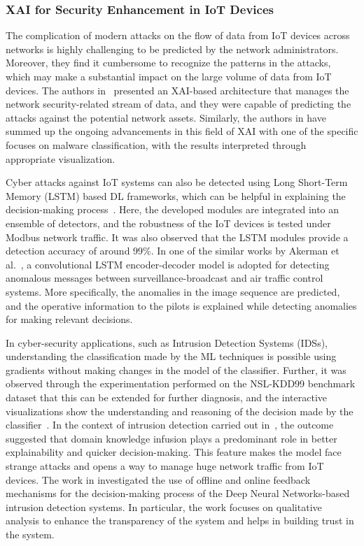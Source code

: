 \documentclass[journal]{IEEEtran}
\begin{document}
\subsubsection{XAI for Security Enhancement in IoT Devices}

The complication of modern attacks on the flow of data from IoT devices across networks is highly challenging to be predicted by the network administrators. Moreover, they find it cumbersome to recognize the patterns in the attacks, which may make a substantial impact on the large volume of data from IoT devices. The authors in~\cite{miloslavskaya2020stream} presented an XAI-based architecture that manages the network security-related stream of data, and they were capable of predicting the attacks against the potential network assets. Similarly, the authors in \cite{mathews2019explainable} have summed up the ongoing advancements in this field of XAI with one of the specific focuses on malware classification, with the results interpreted through appropriate visualization.

Cyber attacks against IoT systems can also be detected using Long Short-Term Memory (LSTM) based DL frameworks, which can be helpful in explaining the decision-making process~\cite{saharkhizan2020ensemble}. Here, the developed modules are integrated into an ensemble of detectors, and the robustness of the IoT devices is tested under Modbus network traffic. It was also observed that the LSTM modules provide a detection accuracy of around 99\%. In one of the similar works by Akerman et al.~\cite{akerman2019vizads}, a convolutional LSTM encoder-decoder model is adopted for detecting anomalous messages between surveillance-broadcast and air traffic control systems. More specifically, the anomalies in the image sequence are predicted, and the operative information to the pilots is explained while detecting anomalies for making relevant decisions.   

In cyber-security applications, such as Intrusion Detection Systems (IDSs), understanding the classification made by the ML techniques is possible using gradients without making changes in the model of the classifier. Further, it was observed through the experimentation performed on the NSL-KDD99 benchmark dataset that this can be extended for further diagnosis, and the interactive visualizations show the understanding and reasoning of the decision made by the classifier~\cite{marino2018adversarial}. In the context of intrusion detection carried out in~\cite{islam2019domain}, the outcome suggested that domain knowledge infusion plays a predominant role in better explainability and quicker decision-making. This feature makes the model face strange attacks and opens a way to manage huge network traffic from IoT devices. The work in \cite{amarasinghe2018improving} investigated the use of offline and online feedback mechanisms for the decision-making process of the Deep Neural Networks-based intrusion detection systems. In particular, the work focuses on qualitative analysis to enhance the transparency of the system and helps in building trust in the system.
\end{document}
